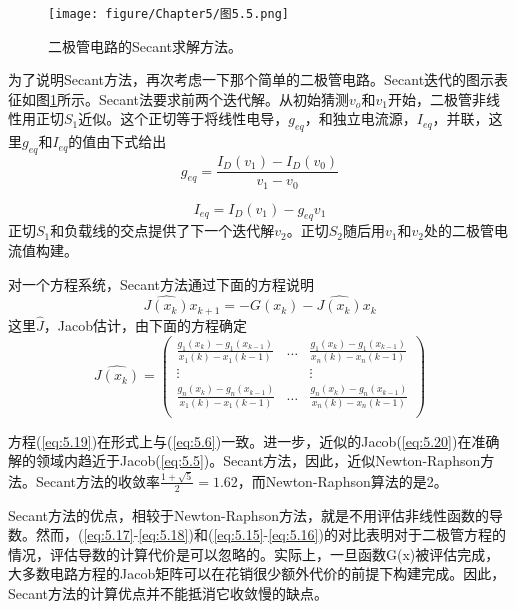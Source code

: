 \begin{figure}[htbp]
\small
    \centering
    \texttt{[image: figure/Chapter5/图5.5.png]}
    \caption{二极管电路的Secant求解方法。}
    \label{图5.5}
\end{figure}

为了说明Secant方法，再次考虑一下那个简单的二极管电路。Secant迭代的图示表征如图\ref{图5.5}所示。Secant法要求前两个迭代解。从初始猜测$v_o$和$v_1$开始，二极管非线性用正切$S_1$近似。这个正切等于将线性电导，$g_{eq}$，和独立电流源，$I_{eq}$，并联，这里$g_{eq}$和$I_{eq}$的值由下式给出
\begin{equation}
    g_{eq} = \frac{I_D(v_1)-I_D(v_0)}{v_1-v_0}
    \label{eq:5.17}
\end{equation}

\begin{equation}
    I_{eq} = I_D(v_1)-g_{eq}v_1
    \label{eq:5.18}
\end{equation}
正切$S_1$和负载线的交点提供了下一个迭代解$v_2$。正切$S_2$随后用$v_1$和$v_2$处的二极管电流值构建。

对一个方程系统，Secant方法通过下面的方程说明
\begin{equation}
    \hat{J(x_k)}x_{k+1} = -G(x_k)-\hat{J(x_k)}x_k
    \label{eq:5.19}
\end{equation}
这里$\hat{J}$，Jacob估计，由下面的方程确定
\begin{equation}
    \hat{J(x_k)}= \begin{pmatrix}
\frac{g_1(x_k)-g_1(x_{k-1})}{x_1(k)-x_1(k-1)} &\dots  & \frac{g_1(x_k)-g_1(x_{k-1})}{x_n(k)-x_n(k-1)}  \\
\vdots &  & \vdots  \\
\frac{g_n(x_k)-g_n(x_{k-1})}{x_1(k)-x_1(k-1)} & \dots  & \frac{g_n(x_k)-g_n(x_{k-1})}{x_n(k)-x_n(k-1)} \\
\end{pmatrix}
\label{eq:5.20}
\end{equation}

方程(\ref{eq:5.19})在形式上与(\ref{eq:5.6})一致。进一步，近似的Jacob(\ref{eq:5.20})在准确解的领域内趋近于Jacob(\ref{eq:5.5})。Secant方法，因此，近似Newton-Raphson方法。Secant方法的收敛率$\frac{1+\sqrt{5}}{2}=1.62$\cite{ref-49}，而Newton-Raphson算法的是2。

Secant方法的优点，相较于Newton-Raphson方法，就是不用评估非线性函数的导数。然而，(\ref{eq:5.17}-\ref{eq:5.18})和(\ref{eq:5.15}-\ref{eq:5.16})的对比表明对于二极管方程的情况，评估导数的计算代价是可以忽略的。实际上，一旦函数G(x)被评估完成，大多数电路方程的Jacob矩阵可以在花销很少额外代价的前提下构建完成。因此，Secant方法的计算优点并不能抵消它收敛慢的缺点。

